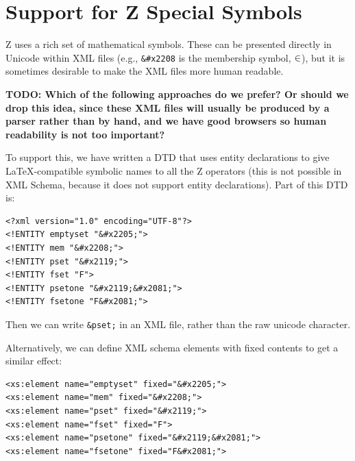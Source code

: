 \documentclass{llncs}  %
\newcommand{\TODO}[1]{\textbf{TODO: #1}}   %
\begin{document}



\section{Support for Z Special Symbols}

Z uses a rich set of mathematical symbols.  These
can be presented directly in Unicode within XML files (e.g., \verb!&#x2208!
is the membership symbol, $\in$), but it is sometimes desirable to make
the XML files more human readable.  

\TODO{Which of the following approaches do we prefer?  Or should we drop
  this idea, since these XML files will usually be produced by
  a parser rather than by hand, and we have good browsers so
  human readability is not too important?}

To support this, we have written a DTD
that uses entity declarations to give \LaTeX-compatible symbolic names to
all the Z operators (this is not possible in XML Schema, because it does
not support entity declarations).  Part of this DTD is:

\begin{small}
\begin{verbatim} 
<?xml version="1.0" encoding="UTF-8"?>
<!ENTITY emptyset "&#x2205;">
<!ENTITY mem "&#x2208;">
<!ENTITY pset "&#x2119;">
<!ENTITY fset "F">
<!ENTITY psetone "&#x2119;&#x2081;">
<!ENTITY fsetone "F&#x2081;">
\end{verbatim}
\end{small}

Then we can write \verb!&pset;! in an XML file, rather than
the raw unicode character.

Alternatively, we can define XML schema elements with fixed contents
to get a similar effect:
\begin{small}
\begin{verbatim} 
<xs:element name="emptyset" fixed="&#x2205;">
<xs:element name="mem" fixed="&#x2208;">
<xs:element name="pset" fixed="&#x2119;">
<xs:element name="fset" fixed="F">
<xs:element name="psetone" fixed="&#x2119;&#x2081;">
<xs:element name="fsetone" fixed="F&#x2081;">
\end{verbatim}
\end{small}
\end{document}
